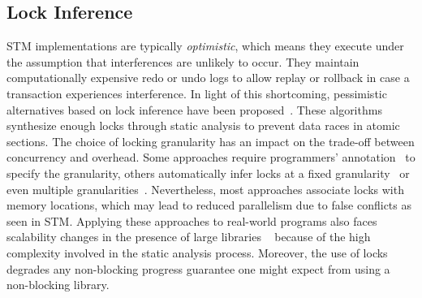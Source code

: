 \documentclass{sig-alternate-05-2015}
\begin{document}
\subsection{Lock Inference}
STM implementations are typically \emph{optimistic}, which means they execute under the assumption that interferences are unlikely to occur.
They maintain computationally expensive redo or undo logs to allow replay or rollback in case a transaction experiences interference.
In light of this shortcoming, pessimistic alternatives based on lock inference have been proposed~\cite{mccloskey2006autolocker}.
These algorithms synthesize enough locks through static analysis to prevent data races in atomic sections.
The choice of locking granularity has an impact on the trade-off between concurrency and overhead.
Some approaches require programmers' annotation~\cite{golan2013concurrent} to specify the granularity, others automatically infer locks at a fixed granularity~\cite{emmi2007lock} or even multiple granularities~\cite{cherem2008inferring}.
Nevertheless, most approaches associate locks with memory locations, which may lead to reduced parallelism due to false conflicts as seen in STM. 
Applying these approaches to real-world programs also faces scalability changes in the presence of large libraries ~\cite{gudka2012lock} because of the high complexity involved in the static analysis process.
Moreover, the use of locks degrades any non-blocking progress guarantee one might expect from using a non-blocking library.
\end{document}
